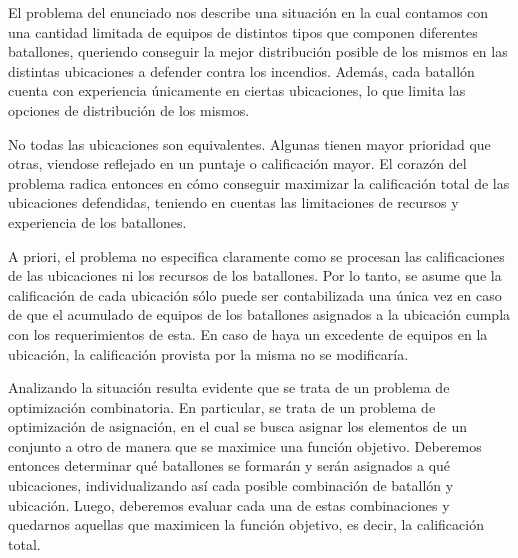 El problema del enunciado nos describe una situación en la cual contamos con una cantidad
limitada de equipos de distintos tipos que componen diferentes batallones, queriendo
conseguir la mejor distribución posible de los mismos en las distintas ubicaciones
a defender contra los incendios. Además, cada batallón cuenta con experiencia únicamente
en ciertas ubicaciones, lo que limita las opciones de distribución de los mismos.

No todas las ubicaciones son equivalentes. Algunas tienen mayor prioridad que otras,
viendose reflejado en un puntaje o calificación mayor. El corazón del problema radica entonces
en cómo conseguir maximizar la calificación total de las ubicaciones defendidas, teniendo en cuentas
las limitaciones de recursos y experiencia de los batallones.

A priori, el problema no especifica claramente como se procesan las calificaciones de las ubicaciones
ni los recursos de los batallones. Por lo tanto, se asume que la calificación de cada ubicación
sólo puede ser contabilizada una única vez en caso de que el acumulado de equipos de los batallones
asignados a la ubicación cumpla con los requerimientos de esta. En caso de haya un excedente de equipos
en la ubicación, la calificación provista por la misma no se modificaría.

Analizando la situación resulta evidente que se trata de un problema de optimización combinatoria.
En particular, se trata de un problema de optimización de asignación, en el cual se busca asignar
los elementos de un conjunto a otro de manera que se maximice una función objetivo. Deberemos entonces
determinar qué batallones se formarán y serán asignados a qué ubicaciones, individualizando así cada posible combinación
de batallón y ubicación. Luego, deberemos evaluar cada una de estas combinaciones y quedarnos aquellas
que maximicen la función objetivo, es decir, la calificación total.

